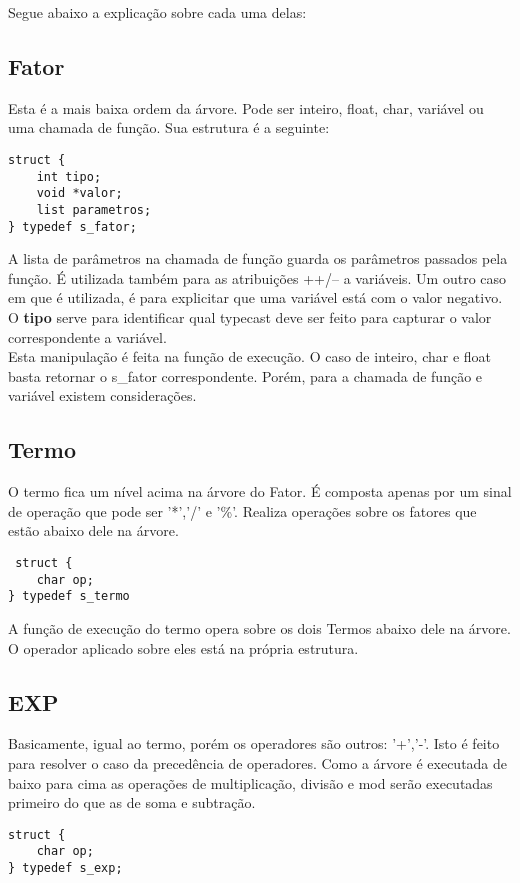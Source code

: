 \documentclass[a4paper,10pt]{article}
\begin{document}
Segue abaixo a explicação sobre cada uma delas:

\subsection{Fator}
Esta é a mais baixa ordem da árvore. Pode ser inteiro, float, char, variável ou uma chamada de função. Sua estrutura é a seguinte:

\begin{lstlisting}
struct {
	int tipo;
	void *valor;
	list parametros;
} typedef s_fator;
\end{lstlisting}

A lista de parâmetros na chamada de função guarda os parâmetros passados pela função. É utilizada também para as atribuições ++/-- a variáveis. Um outro caso em que é utilizada,
é para explicitar que uma variável está com o valor negativo. 
O \textbf{tipo} serve para identificar qual typecast deve ser feito para capturar o valor correspondente a variável.\\
Esta manipulação é feita na função de execução. O caso de inteiro, char e float basta retornar o s\_fator correspondente. Porém, para a chamada de função e variável existem
considerações.
\subsection{Termo}

O termo fica um nível acima na árvore do Fator. É composta apenas por um sinal de operação que pode ser '*','/' e '\%'. Realiza operações sobre os fatores que estão abaixo dele na árvore.

\begin{lstlisting}
 struct {
	char op;
} typedef s_termo
\end{lstlisting}

A função de execução do termo opera sobre os dois Termos abaixo dele na árvore. O operador aplicado sobre eles está na própria estrutura.

\subsection{EXP}
Basicamente, igual ao termo, porém os operadores são outros: '+','-'. Isto é feito para resolver o caso da precedência de operadores. Como a árvore é executada de baixo para cima as operações de multiplicação, divisão e mod serão executadas primeiro do que as de soma e subtração.

\begin{lstlisting}
struct {
	char op;
} typedef s_exp;
\end{lstlisting}
\end{document}
